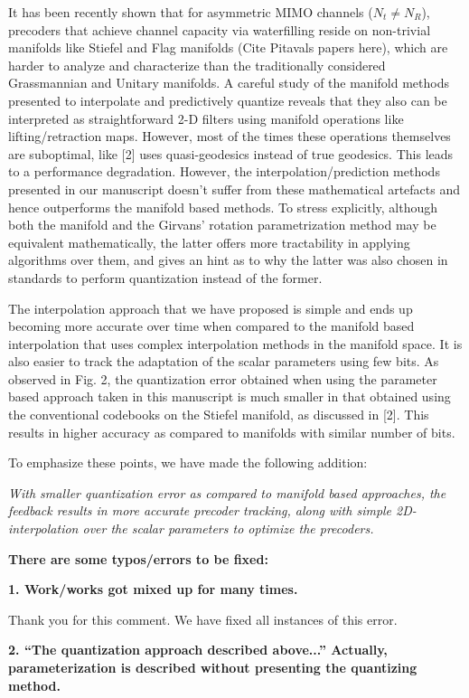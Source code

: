\documentclass[12pt]{letter}
\begin{document}
It has been recently shown that for asymmetric MIMO channels ($N_t\neq N_R$), precoders that achieve channel capacity via waterfilling reside on non-trivial manifolds like Stiefel and Flag manifolds (Cite Pitavals papers here), which are harder to analyze and characterize than the traditionally considered Grassmannian and Unitary manifolds. A careful study of the manifold methods presented to interpolate and predictively quantize reveals that they also can be interpreted as straightforward 2-D filters using manifold operations like lifting/retraction maps. However, most of the times these operations themselves are suboptimal, like [2] uses quasi-geodesics instead of true geodesics. This leads to a performance degradation. However, the interpolation/prediction methods presented in our manuscript doesn't suffer from these mathematical artefacts and hence outperforms the manifold based methods. To stress explicitly, although both the manifold and the Girvans' rotation parametrization method may be equivalent mathematically, the latter offers more tractability in applying algorithms over them, and gives an hint as to why the latter was also chosen in standards to perform quantization instead of the former.

The interpolation approach that we have
proposed is simple and ends up becoming more accurate over time when
compared to the manifold based interpolation that uses complex
interpolation methods in the manifold space. It is also easier to
track the adaptation of the scalar parameters using few bits. As
observed in Fig. 2, the quantization error obtained when using the
parameter based approach taken in this manuscript is much smaller in
that obtained using the conventional codebooks on the Stiefel
manifold, as discussed in [2]. This results in higher accuracy as
compared to manifolds with similar number of bits.

To emphasize these points, we have made the following addition:

\emph{With smaller
quantization error as compared to manifold based approaches, the
feedback results in more accurate precoder tracking, along with simple
2D-interpolation over the scalar parameters to optimize the precoders.}

\textbf{There are some typos/errors to be fixed:}

\textbf{1. Work/works got mixed up for many times.}

Thank you for this comment. We have fixed all instances of this error.

\textbf{2. ``The quantization approach described above...'' Actually,
  parameterization is described without presenting the quantizing
  method.}
\end{document}
